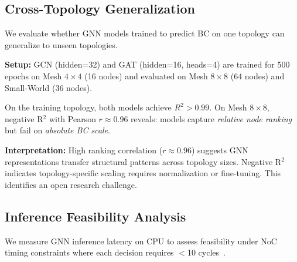 \documentclass[conference]{IEEEtran}
\begin{document}
\subsection{Cross-Topology Generalization}
\label{sec:results-generalization}

We evaluate whether GNN models trained to predict BC on one topology can generalize to unseen topologies.

\textbf{Setup:} GCN (hidden=32) and GAT (hidden=16, heads=4) are trained for 500 epochs on Mesh $4\times4$ (16 nodes) and evaluated on Mesh $8\times8$ (64 nodes) and Small-World (36 nodes).

\begin{table}[h]
\centering
\caption{Cross-topology BC prediction (trained on Mesh $4\times4$)}
\label{tab:generalization}
\small
{}
\end{table}

On the training topology, both models achieve $R^2>0.99$. On Mesh $8\times8$, negative R$^2$ with Pearson $r\approx0.96$ reveals: models capture \emph{relative node ranking} but fail on \emph{absolute BC scale}.

\textbf{Interpretation:} High ranking correlation ($r\approx0.96$) suggests GNN representations transfer structural patterns across topology sizes. Negative R$^2$ indicates topology-specific scaling requires normalization or fine-tuning. This identifies an open research challenge.

\subsection{Inference Feasibility Analysis}
\label{sec:results-latency}

We measure GNN inference latency on CPU to assess feasibility under NoC timing constraints where each decision requires $<$10 cycles~\cite{wang2022maar}.
\end{document}
